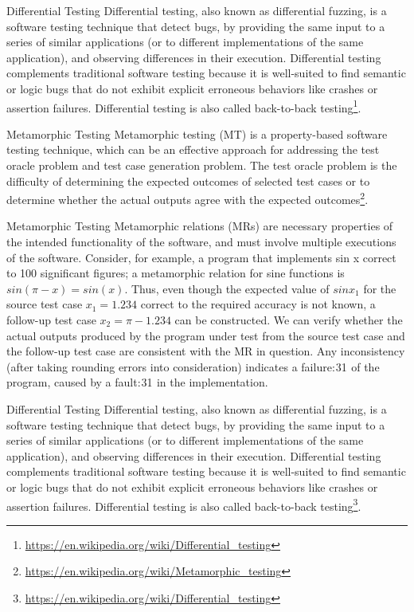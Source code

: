 \documentclass{beamer}
\begin{document}
\begin{frame}[t]{Differential Testing}
Differential testing, also known as differential fuzzing, is a software testing technique that detect bugs, by providing the same input to a series of similar applications (or to different implementations of the same application), and observing differences in their execution. Differential testing complements traditional software testing because it is well-suited to find semantic or logic bugs that do not exhibit explicit erroneous behaviors like crashes or assertion failures. Differential testing is also called back-to-back testing\footnote{\url{https://en.wikipedia.org/wiki/Differential_testing}}.
\end{frame}


\begin{frame}[t]{Metamorphic Testing}
Metamorphic testing (MT) is a property-based software testing technique, which can be an effective approach for addressing the test oracle problem and test case generation problem. The test oracle problem is the difficulty of determining the expected outcomes of selected test cases or to determine whether the actual outputs agree with the expected outcomes\footnote{\url{https://en.wikipedia.org/wiki/Metamorphic_testing}}.
\end{frame}

\begin{frame}[t]{Metamorphic Testing}
Metamorphic relations (MRs) are necessary properties of the intended functionality of the software, and must involve multiple executions of the software. Consider, for example, a program that implements sin x correct to 100 significant figures; a metamorphic relation for sine functions is $sin (\pi − x) = sin(x)$. Thus, even though the expected value of $sin x_1$ for the source test case $x_1 = 1.234$ correct to the required accuracy is not known, a follow-up test case $x_2 = \pi − 1.234$ can be constructed. We can verify whether the actual outputs produced by the program under test from the source test case and the follow-up test case are consistent with the MR in question. Any inconsistency (after taking rounding errors into consideration) indicates a failure: 31  of the program, caused by a fault: 31  in the implementation.
\end{frame}
\begin{frame}[t]{Differential Testing}
    Differential testing, also known as differential fuzzing, is a software testing technique that detect bugs, by providing the same input to a series of similar applications (or to different implementations of the same application), and observing differences in their execution. Differential testing complements traditional software testing because it is well-suited to find semantic or logic bugs that do not exhibit explicit erroneous behaviors like crashes or assertion failures. Differential testing is also called back-to-back testing\footnote{\url{https://en.wikipedia.org/wiki/Differential_testing}}.
\end{frame}
\end{document}
